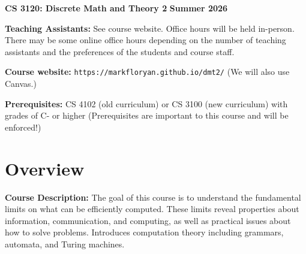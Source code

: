 \documentclass[12pt]{article}
\begin{document}
\textbf{\Large CS 3120: Discrete Math and Theory 2} \hfill \textbf{\Large Summer 2026}

\vskip 0.5in 


\vskip 0.1in
\textbf{Teaching Assistants:} See course website.  Office hours will be held in-person. There may be some online office hours depending on the number of teaching assistants and the preferences of the students and course staff.

\vskip 0.1in
\textbf{Course website:} {\tt https://markfloryan.github.io/dmt2/} (We will also use Canvas.)

\textbf{Prerequisites:} CS 4102 (old curriculum) or CS 3100 (new curriculum) with grades of C- or higher (Prerequisites are important to this course and will be enforced!)

\section*{Overview}

\textbf{Course Description:} The goal of this course is to understand the fundamental limits on what can be efficiently computed. These limits reveal properties about information, communication, and computing, as well as practical issues about how to solve problems. Introduces computation theory including grammars, automata, and Turing machines.
\end{document}

